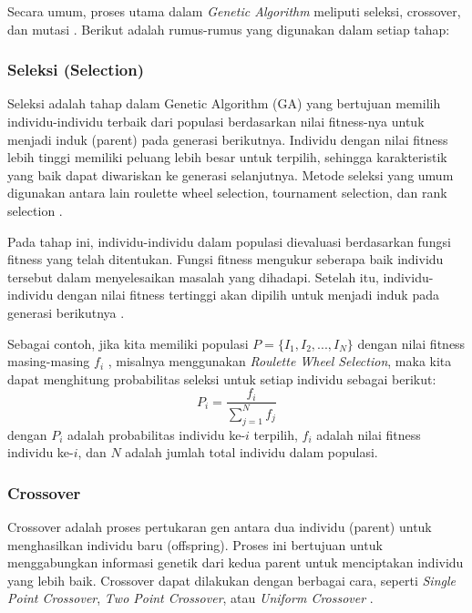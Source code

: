 Secara umum, proses utama dalam \textit{Genetic Algorithm} meliputi seleksi, crossover, dan mutasi \cite{saputro2015implementasi}. Berikut adalah rumus-rumus yang digunakan dalam setiap tahap:

\subsubsection{Seleksi (Selection)} \label{II.GA.Selection}
Seleksi adalah tahap dalam Genetic Algorithm (GA) yang bertujuan memilih individu-individu terbaik dari populasi berdasarkan nilai fitness-nya untuk menjadi induk (parent) pada generasi berikutnya. Individu dengan nilai fitness lebih tinggi memiliki peluang lebih besar untuk terpilih, sehingga karakteristik yang baik dapat diwariskan ke generasi selanjutnya. Metode seleksi yang umum digunakan antara lain roulette wheel selection, tournament selection, dan rank selection \cite{naufal2025optimization}.

Pada tahap ini, individu-individu dalam populasi dievaluasi berdasarkan fungsi fitness yang telah ditentukan. Fungsi fitness mengukur seberapa baik individu tersebut dalam menyelesaikan masalah yang dihadapi. Setelah itu, individu-individu dengan nilai fitness tertinggi akan dipilih untuk menjadi induk pada generasi berikutnya \cite{naufal2025optimization}\cite{Matousek2008GeneticAA}.

Sebagai contoh, jika kita memiliki populasi $P = \{I_1, I_2, ..., I_N\}$ dengan nilai fitness masing-masing $f_i$ \cite{Matousek2008GeneticAA}, misalnya menggunakan \textit{Roulette Wheel Selection}, maka kita dapat menghitung probabilitas seleksi untuk setiap individu sebagai berikut:
\begin{equation}
	P_i = \frac{f_i}{\sum_{j=1}^{N} f_j}
	\label{eq:ga-selection}
\end{equation}
dengan $P_i$ adalah probabilitas individu ke-$i$ terpilih, $f_i$ adalah nilai fitness individu ke-$i$, dan $N$ adalah jumlah total individu dalam populasi.

\vspace{0.5em}

\subsubsection{Crossover} \label{II.GA.Crossover}
Crossover adalah proses pertukaran gen antara dua individu (parent) untuk menghasilkan individu baru (offspring). Proses ini bertujuan untuk menggabungkan informasi genetik dari kedua parent untuk menciptakan individu yang lebih baik. Crossover dapat dilakukan dengan berbagai cara, seperti \textit{Single Point Crossover}, \textit{Two Point Crossover}, atau \textit{Uniform Crossover} \cite{Pachuau2020AnOO}.

